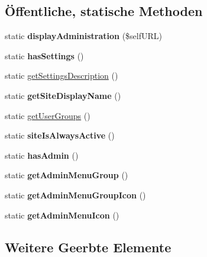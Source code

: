\subsection*{Öffentliche, statische Methoden}
\begin{DoxyCompactItemize}
\item 
\mbox{\label{classadministrationgroups_a4b3321f1912c546e3d4a189475da091f}} 
static {\bfseries display\+Administration} (\$self\+U\+RL)
\item 
\mbox{\label{classadministrationgroups_a10e6b5653d513bae18bb0d322b866b06}} 
static {\bfseries has\+Settings} ()
\item 
static \mbox{\hyperlink{classadministrationgroups_a52fddd1dca1f58bd62a19e2566e64d28}{get\+Settings\+Description}} ()
\item 
\mbox{\label{classadministrationgroups_ac5c13bd25bd1c8cf73ea66972959dc10}} 
static {\bfseries get\+Site\+Display\+Name} ()
\item 
static \mbox{\hyperlink{classadministrationgroups_aa7f2d7da9d6838ed5fc66b01e7a7ff5e}{get\+User\+Groups}} ()
\item 
\mbox{\label{classadministrationgroups_aaa0d7ad90078013e028ad897b4c036c7}} 
static {\bfseries site\+Is\+Always\+Active} ()
\item 
\mbox{\label{classadministrationgroups_a53f4d18d575d4018159705c0fafdb606}} 
static {\bfseries has\+Admin} ()
\item 
\mbox{\label{classadministrationgroups_a9bf86f9c222c8e095ab384ff47ae3086}} 
static {\bfseries get\+Admin\+Menu\+Group} ()
\item 
\mbox{\label{classadministrationgroups_a4fe2099291e7f1c657ea961eff754ba2}} 
static {\bfseries get\+Admin\+Menu\+Group\+Icon} ()
\item 
\mbox{\label{classadministrationgroups_a6982fbd9e0318f87c87b42d814fb5be0}} 
static {\bfseries get\+Admin\+Menu\+Icon} ()
\end{DoxyCompactItemize}
\subsection*{Weitere Geerbte Elemente}



